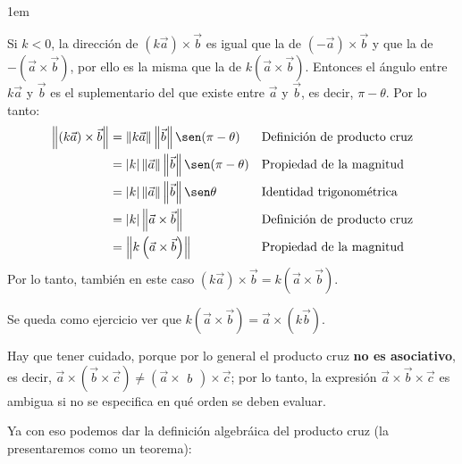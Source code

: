 \documentclass[12pt, fleqn]{report}                             %
\newenvironment{SmallIndentation}[1][0.75em]                    %
    {\begin{adjustwidth}{#1}{}\begin{footnotesize}}                 %
    {\end{footnotesize}\end{adjustwidth}}                           %
\newcommand{\abs}[1]{\left\lvert #1 \right\lvert}               %
\newcommand{\Abs}[1]{\left\lVert #1 \right\lVert}               %
\newcommand{\Wrap}[1]{\left( #1 \right)}                        %
\newcommand{\Vector}[1]                                         %
        { \ensuremath{\begin{matrix}#1\end{matrix}} }               %
\begin{document}
\begin{SmallIndentation}[1em]
\begin{itemize}
            			Si $k<0$, la dirección de $\Wrap{k\vec{a}} \times \vec{b}$ es igual que la de $\Wrap{-\vec{a}} \times \vec{b}$ y que la de $-\Wrap{\vec{a} \times \vec{b}}$, por ello es la misma que la de $k\Wrap{\vec{a} \times \vec{b}}$. Entonces el ángulo entre $k\vec{a}$ y $\vec{b}$ es el suplementario del que existe entre $\vec{a}$ y $\vec{b}$, es decir, $\pi-\theta$. Por lo tanto:
            			\begin{align*}
	            			\Abs{(k\vec{a}) \times \vec{b}} &= \Abs{k\vec{a}} \Abs{\vec{b}} \sen(\pi-\theta) &&\mbox{Definición de producto cruz}\\
	            			&= \abs{k} \Abs{\vec{a}} \Abs{\vec{b}} \sen(\pi-\theta) &&\mbox{Propiedad de la magnitud}\\
	            			&= \abs{k} \Abs{\vec{a}} \Abs{\vec{b}} \sen \theta &&\mbox{Identidad trigonométrica}\\
	            			&= \abs{k} \Abs{\vec{a} \times \vec{b}} && \mbox{Definición de producto cruz}\\
	            			&= \Abs{k\Wrap{\vec{a} \times \vec{b}}} && \mbox{Propiedad de la magnitud}
            			\end{align*}
            			Por lo tanto, también en este caso $\Wrap{k\vec{a}} \times \vec{b} = k\Wrap{\vec{a} \times \vec{b}}$.
            			
            			Se queda como ejercicio ver que $k\Wrap{\vec{a} \times \vec{b}} = \vec{a} \times \Wrap{k \vec{b}}$.
            		\end{itemize}
            	\end{SmallIndentation}
            
            	Hay que tener cuidado, porque por lo general el producto cruz \textbf{no es asociativo}, es decir, $\vec{a} \times \Wrap{\vec{b} \times \vec{c}} \neq \Wrap{\vec{a} \times \Vector{b}} \times \vec{c}$; por lo tanto, la expresión $\vec{a} \times \vec{b} \times \vec{c}$ es ambigua si no se especifica en qué orden se deben evaluar.
            	
            	Ya con eso podemos dar la definición algebráica del producto cruz (la presentaremos como un teorema):
            	
            	
\end{document}
